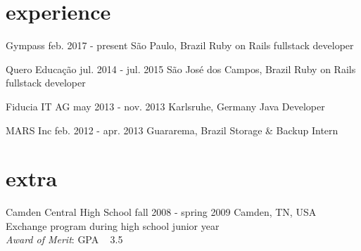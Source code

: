 \documentclass[]{friggeri-cv}
\begin{document}
\section{experience}

\begin{entrylist}
  \entry
  {Gympass}
  {feb. 2017 - present}
  {São Paulo, Brazil}
  {Ruby on Rails fullstack developer}
  
  \entry
    {Quero Educação}
    {jul. 2014 - jul. 2015}
    {São José dos Campos, Brazil}
    {Ruby on Rails fullstack developer}

  \entry
  	{Fiducia IT AG}
    {may 2013 - nov. 2013}
    {Karlsruhe, Germany}
    {Java Developer}

  \entry
    {MARS Inc}
    {feb. 2012 - apr. 2013}
    {Guararema, Brazil}
    {Storage \& Backup Intern}

\end{entrylist}

\section{extra}

\begin{entrylist}
  \entry
    {Camden Central High School}
    {fall 2008 - spring 2009}
    {Camden, TN, USA}
    {Exchange program during high school junior year\\
    \textit{Award of Merit}: GPA \geq ~ 3.5}\\


\end{entrylist}
\end{document}
